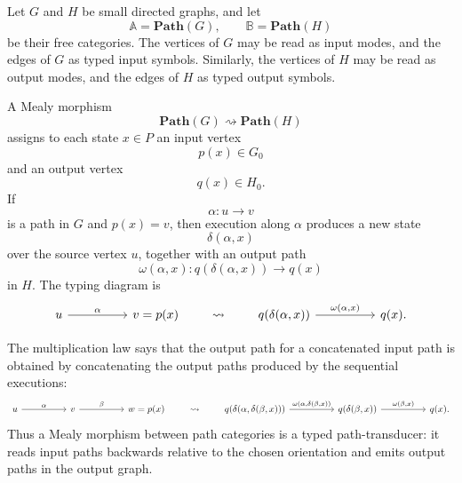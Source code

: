 \begin{example}
\label{example:typed-mealy-machines-path-categories}  
    Let \(G\) and \(H\) be small directed graphs, and let
    \[
        \mathbb A=\mathbf{Path}(G),
        \qquad
        \mathbb B=\mathbf{Path}(H)
    \]
    be their free categories. The vertices of \(G\) may be read as input modes, and the edges of \(G\) as typed input symbols. Similarly, the vertices of \(H\) may be read as output modes, and the edges of \(H\) as typed output symbols.
    
    A Mealy morphism
    \[
        \mathbf{Path}(G)\rightsquigarrow\mathbf{Path}(H)
    \]
    assigns to each state \(x\in P\) an input vertex
    \[
        p(x)\in G_0
    \]
    and an output vertex
    \[
        q(x)\in H_0.
    \]
    If
    \[
        \alpha:u\to v
    \]
    is a path in \(G\) and \(p(x)=v\), then execution along \(\alpha\) produces a new state
    \[
        \delta(\alpha,x)
    \]
    over the source vertex \(u\), together with an output path
    \[
        \omega(\alpha,x):q(\delta(\alpha,x))\to q(x)
    \]
    in \(H\). The typing diagram is
    \[
    \begin{tikzcd}[column sep=huge]
            {u}
                \arrow[r, "{\alpha}"]
        &
            {v=p(x)}
    \end{tikzcd}
    \qquad\leadsto\qquad
    \begin{tikzcd}[column sep=huge]
            {q(\delta(\alpha,x))}
                \arrow[r, "{\omega(\alpha,x)}"]
        &
            {q(x)}.
    \end{tikzcd}
    \]
    
    The multiplication law says that the output path for a concatenated input path is obtained by concatenating the output paths produced by the sequential executions:
    \[
    \begin{tikzcd}[column sep=huge]
            {u}
                \arrow[r, "{\alpha}"]
        &
            {v}
                \arrow[r, "{\beta}"]
        &
            {w=p(x)}
    \end{tikzcd}
    \qquad\leadsto\qquad
    \begin{tikzcd}[column sep=huge]
            {q(\delta(\alpha,\delta(\beta,x)))}
                \arrow[r, "{\omega(\alpha,\delta(\beta,x))}"]
        &
            {q(\delta(\beta,x))}
                \arrow[r, "{\omega(\beta,x)}"]
        &
            {q(x)}.
    \end{tikzcd}
    \]
    Thus a Mealy morphism between path categories is a typed path-transducer: it reads input paths backwards relative to the chosen orientation and emits output paths in the output graph.
    

\end{example}
